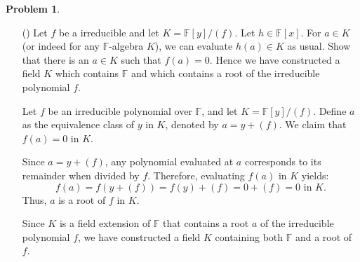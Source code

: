 \documentclass[12pt]{article}
\theoremstyle{definition}
\newtheorem{problem}{Problem}
\newcounter{subq}[problem]
\newenvironment{subproblem}
{\refstepcounter{subq} \begin{itemize} \item[(\alph{subq})]}
{\end{itemize} \medskip}
\begin{document}
\begin{problem}
    \begin{subproblem}
        Let $f$ be a irreducible and let $K = \mathbb{F}[y]/(f)$. Let $h \in \mathbb{F}[x]$. For $a \in K$ (or indeed for any
        $\mathbb{F}$-algebra $K$), we can evaluate $h(a) \in K$ as usual. Show that there is an $a \in K$ such that $f(a) = 0$.
        Hence we have constructed a field $K$ which contains $\mathbb{F}$ and which contains a root of the irreducible polynomial $f$.

        \begin{solution}
            Let \(f\) be an irreducible polynomial over \(\mathbb{F}\), and let \(K = \mathbb{F}[y]/(f)\). Define \(a\) as the equivalence class of \(y\) in \(K\), denoted by \(a = y + (f)\). We claim that \(f(a) = 0\) in \(K\).

            Since \(a = y + (f)\), any polynomial evaluated at \(a\) corresponds to its remainder when divided by \(f\). Therefore, evaluating \(f(a)\) in \(K\) yields:
            \[
            f(a) = f(y + (f)) = f(y) + (f) = 0 + (f) = 0 \text{ in } K.
            \]
            Thus, \(a\) is a root of \(f\) in \(K\).

            Since \(K\) is a field extension of \(\mathbb{F}\) that contains a root \(a\) of the irreducible polynomial \(f\), we have constructed a field \(K\) containing both \(\mathbb{F}\) and a root of \(f\).
        \end{solution}
    \end{subproblem}
\end{problem}
\end{document}
